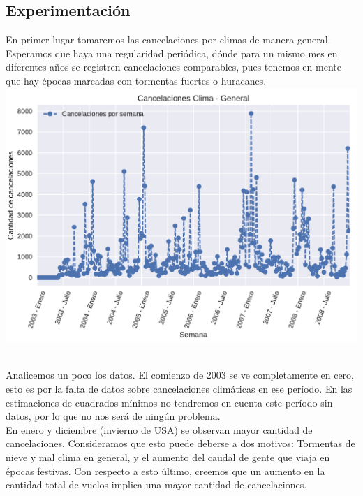 \subsection{Experimentación}

En primer lugar tomaremos las cancelaciones por climas de manera general. Esperamos que haya una regularidad periódica, dónde para un mismo mes en diferentes años se registren cancelaciones comparables, pues tenemos en mente que hay épocas marcadas con tormentas fuertes o huracanes. \\

{\centering
    \includegraphics[scale=0.8]{informe/imagenes/cancelacionesClimaGeneralPlotV1.pdf} \\
}
$ $\newline

Analicemos un poco los datos. El comienzo de 2003 se ve completamente en cero, esto es por la falta de datos sobre cancelaciones climáticas en ese período. En las estimaciones de cuadrados mínimos no tendremos en cuenta este período sin datos, por lo que no nos será de ningún problema. \\

En enero y diciembre (invierno de USA) se observan mayor cantidad de cancelaciones. Consideramos que esto puede deberse a dos motivos: Tormentas de nieve y mal clima en general, y el aumento del caudal de gente que viaja en épocas festivas. Con respecto a esto último, creemos que un aumento en la cantidad total de vuelos implica una mayor cantidad de cancelaciones. \\


